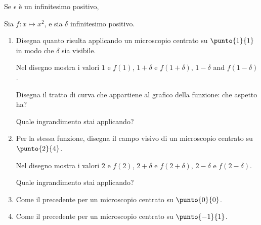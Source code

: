 \begin{esercizio}
 Se \(\epsilon\) è un infinitesimo positivo, 
\end{esercizio}

\begin{esercizio}
Sia \(f:x\mapsto x^2\),  e sia \(\delta\) infinitesimo positivo.

\begin{enumerate} [noitemsep]
\item Disegna quanto risulta applicando un microscopio centrato su \(\punto{1}{1}\)
in modo che \(\delta\) sia visibile.

Nel disegno mostra i valori \(1\) e \(f(1)\),  \(1+\delta\) e 
\(f(1+\delta)\),  \(1-\delta\) and \(f(1-\delta)\).

Disegna il tratto di curva che appartiene al grafico della funzione: che 
aspetto ha?

Quale ingrandimento stai applicando?

\item Per la stessa funzione, disegna il campo visivo di un microscopio
centrato su \(\punto{2}{4}\).

Nel disegno mostra i valori \(2\) e \(f(2)\), \(2+\delta\) e \(f(2+\delta)\), 
\(2-\delta\) e \(f(2-\delta)\).

Quale ingrandimento stai applicando?

\item Come il precedente per un microscopio centrato su \(\punto {0}{0}\).
\item Come il precedente per un microscopio centrato su \(\punto {-1}{1}\).
\end{enumerate}
\end{esercizio}



